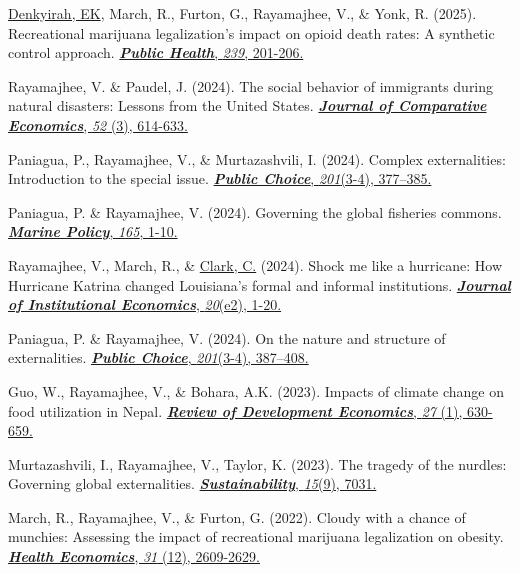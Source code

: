 \documentclass[12pt,letterpaper]{report}
\begin{document}
\begin{etaremune} [leftmargin=15 pt, start=30, itemsep=3pt]
\item \underline{Denkyirah, EK}, March, R., Furton, G., Rayamajhee, V., \& Yonk, R. (2025). Recreational marijuana legalization's impact on opioid death rates: A synthetic control approach.
\href{https://doi.org/10.1016/j.puhe.2024.12.047}
{\textit{\textbf{Public Health}}, \textit{239}, 201-206.}

\item Rayamajhee, V. \& Paudel, J. (2024). The social behavior of immigrants during natural disasters: Lessons from the United States.
\href{https://doi.org/10.1016/j.jce.2024.06.005} {\textit{\textbf{Journal of Comparative Economics}}, \textit{52} (3), 614-633.}


\item Paniagua, P., Rayamajhee, V., \& Murtazashvili, I. (2024). Complex externalities: Introduction to the special issue. \href{https://doi.org/10.1007/s11127-024-01176-y}
{\textit{\textbf{Public Choice}}, \textit{201}(3-4), 377–385.}

\item Paniagua, P. \& Rayamajhee, V. (2024). Governing the global fisheries commons. \href{https://doi.org/10.1016/j.marpol.2024.106182}
{\textit{\textbf{Marine Policy}}, \textit{165}, 1-10.}

\item Rayamajhee, V., March, R., \& \underline{Clark, C.} (2024). Shock me like a hurricane: How Hurricane Katrina changed Louisiana’s formal and informal institutions.
\href{https://doi.org/10.1017/S1744137423000267}
{\textit{\textbf{Journal of Institutional Economics}}, \textit{20}(e2), 1-20.}

\item Paniagua, P. \& Rayamajhee, V. (2024).  On the nature and structure of externalities.
\href{https://doi.org/10.1007/s11127-023-01098-1}
{\textit{\textbf{Public Choice}}, \textit{201}(3-4), 387–408.}


\item Guo, W., Rayamajhee, V., \& Bohara, A.K. (2023). Impacts of climate change on food utilization in Nepal.
\href{https://doi.org/10.1111/rode.12953}
{\textit{\textbf{Review of Development Economics}}, \textit{27} (1), 630-659.
}

\item Murtazashvili, I., Rayamajhee, V., Taylor, K. (2023). The tragedy of the nurdles: Governing global externalities.
\href{https://doi.org/10.3390/su15097031}
{\textit{\textbf{Sustainability}}, \textit{15}(9), 7031.
}

\item March, R.,  Rayamajhee, V., \& Furton, G.   (2022). Cloudy with a chance of munchies: Assessing the impact of recreational marijuana legalization on obesity.
\href{https://doi.org/10.1002/hec.4598}
{\textit{\textbf{Health Economics}}, \textit{31} (12), 2609-2629.
}


\end{etaremune}
\end{document}

